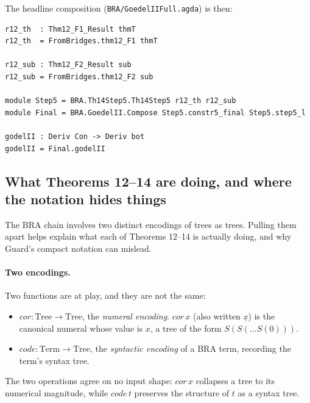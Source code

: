 \documentclass[11pt]{article}
\begin{document}
The headline composition (\verb|BRA/GoedelIIFull.agda|) is then:

\begin{verbatim}
r12_th  : Thm12_F1_Result thmT
r12_th  = FromBridges.thm12_F1 thmT

r12_sub : Thm12_F2_Result sub
r12_sub = FromBridges.thm12_F2 sub

module Step5 = BRA.Th14Step5.Th14Step5 r12_th r12_sub
module Final = BRA.GoedelII.Compose Step5.constr5_final Step5.step5_l

godelII : Deriv Con -> Deriv bot
godelII = Final.godelII
\end{verbatim}

\subsection{What Theorems 12--14 are doing, and where the notation hides things}
\label{subsec:modal-perspective}

The BRA chain involves two distinct encodings of trees as trees.  Pulling
them apart helps explain what each of Theorems 12--14 is actually doing,
and why Guard's compact notation can mislead.

\paragraph{Two encodings.}
Two functions are at play, and they are not the same:
\begin{itemize}
  \item $\mathit{cor} : \mathrm{Tree} \to \mathrm{Tree}$, the
        \emph{numeral encoding}.  $\mathit{cor}\,x$ (also written
        $\underline{x}$) is the canonical numeral whose value is $x$,
        a tree of the form $S(S(\ldots S(0)))$.
  \item $\mathit{code} : \mathrm{Term} \to \mathrm{Tree}$, the
        \emph{syntactic encoding} of a BRA term, recording the term's
        syntax tree.
\end{itemize}
The two operations agree on no input shape: $\mathit{cor}\,x$ collapses
a tree to its numerical magnitude, while $\mathit{code}\,t$ preserves
the structure of $t$ as a syntax tree.
\end{document}
